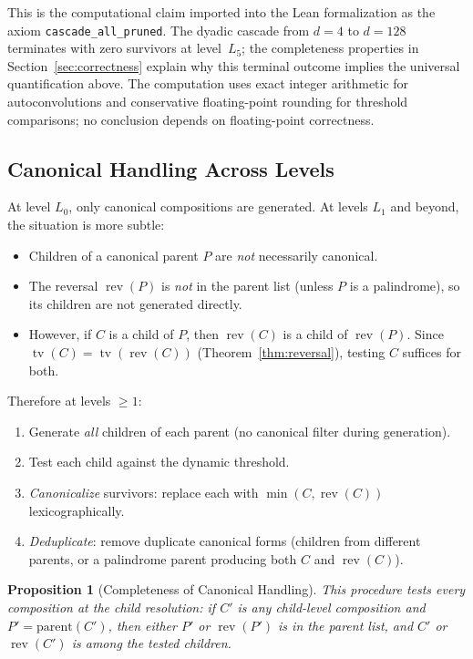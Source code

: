 \documentclass[11pt, letterpaper]{article}
\theoremstyle{paperplain}
\newtheorem{proposition}[theorem]{Proposition}
\theoremstyle{paperdef}
\newcommand{\tv}{\operatorname{tv}}
\newcommand{\rev}{\operatorname{rev}}
\begin{document}
This is the computational claim imported into the Lean formalization as
the axiom \texttt{cascade\_all\_pruned}.  The dyadic cascade from $d=4$
to $d=128$ terminates with zero survivors at level~$L_5$; the
completeness properties in Section~\ref{sec:correctness} explain why
this terminal outcome implies the universal quantification above.  The
computation uses exact integer arithmetic for autoconvolutions and
conservative floating-point rounding for threshold comparisons; no
conclusion depends on floating-point correctness.

\subsection{Canonical Handling Across Levels}

At level $L_0$, only canonical compositions are generated.  At levels
$L_1$ and beyond, the situation is more subtle:

\begin{itemize}
  \item Children of a canonical parent $P$ are \emph{not} necessarily
    canonical.
  \item The reversal $\rev(P)$ is \emph{not} in the parent list
    (unless $P$ is a palindrome), so its children are not generated
    directly.
  \item However, if $C$ is a child of $P$, then $\rev(C)$ is a child
    of $\rev(P)$.  Since $\tv(C) = \tv(\rev(C))$
    (Theorem~\ref{thm:reversal}), testing $C$ suffices for both.
\end{itemize}

Therefore at levels $\ge 1$:
\begin{enumerate}
  \item Generate \emph{all} children of each parent (no canonical
    filter during generation).
  \item Test each child against the dynamic threshold.
  \item \emph{Canonicalize} survivors: replace each with
    $\min(C, \rev(C))$ lexicographically.
  \item \emph{Deduplicate}: remove duplicate canonical forms (children
    from different parents, or a palindrome parent producing both $C$
    and $\rev(C)$).
\end{enumerate}

\begin{proposition}[Completeness of Canonical Handling]
This procedure tests every composition at the child resolution:
if $C'$ is any child-level composition and $P' = \text{parent}(C')$,
then either $P'$ or $\rev(P')$ is in the parent list, and $C'$ or
$\rev(C')$ is among the tested children.
\end{proposition}
\end{document}
